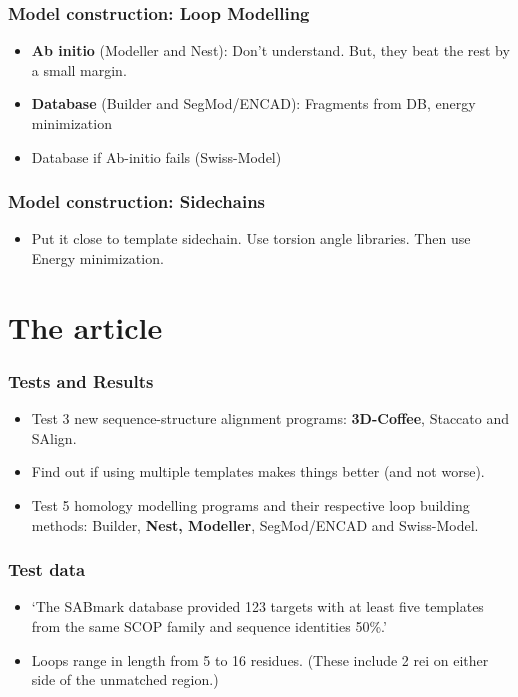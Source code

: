 \documentclass{beamer}
\begin{document}
\begin{frame}
\frametitle{Model construction: Loop Modelling}
\begin{itemize}
\item \textbf{Ab initio} (Modeller and Nest): Don't understand. But, they beat the rest by a small margin.
\item \textbf{Database} (Builder and SegMod/ENCAD): Fragments from DB, energy minimization
\item Database if Ab-initio fails (Swiss-Model)
\end{itemize}
\end{frame}

\begin{frame}
\frametitle{Model construction: Sidechains}
\begin{itemize}
\item Put it close to template sidechain. Use torsion angle libraries. Then use Energy minimization.
\end{itemize}
\end{frame}

\section{The article}

\begin{frame}
\frametitle{Tests and Results}
\begin{itemize}
\item Test 3 new sequence-structure alignment programs: \textbf{3D-Coffee}, Staccato and SAlign.
\item Find out if using multiple templates makes things better (and not worse).
\item Test 5 homology modelling programs and their respective loop building methods: Builder, \textbf{Nest, Modeller}, SegMod/ENCAD and Swiss-Model.
\end{itemize}
\end{frame}

\begin{frame}
\frametitle{Test data}
\begin{itemize}
\item `The SABmark database provided 123 targets with at least five templates from the same SCOP family and sequence identities 50\%.' \cite{dalton07}
\item Loops range in length from 5 to 16 residues. (These include 2 rei on either side of the unmatched region.)
\end{itemize}
\end{frame}
\end{document}
